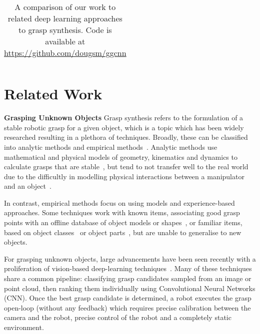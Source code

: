 \documentclass[conference]{IEEEtran}
\begin{document}
\begin{table*}[t!]
\begin{center}
\begin{tabular}{@{}lcccccccccc@{}}
        \bottomrule
        \end{tabular}
    
        \vspace{2mm}
        \caption{ A comparison of our work to related deep learning approaches to grasp synthesis.  \newline * Code is available at \href{https://github.com/dougsm/ggcnn}{https://github.com/dougsm/ggcnn}}
        \label{tab:comparison}
        \vspace{-8mm}
    \end{center}
    
\end{table*}


\section{Related Work}

\textbf{Grasping Unknown Objects}
Grasp synthesis refers to the formulation of a stable robotic grasp for a given object, which is a topic which has been widely researched resulting in a plethora of techniques.  Broadly, these can be classified into analytic methods and empirical methods~\cite{bohg2014data,sahbani2012overview}.  Analytic methods use mathematical and physical models of geometry, kinematics and dynamics to calculate grasps that are stable~\cite{bicchi2000robotic,Prattichizzo2008Grasping}, but tend to not transfer well to the real world due to the difficultly in modelling physical interactions between a manipulator and an object~\cite{bicchi2000robotic, Rubert2017OnSuccess, sahbani2012overview}.

In contrast, empirical methods focus on using models and experience-based approaches.  Some techniques work with known items, associating good grasp points with an offline database of object models or shapes~\cite{detry2009learning, goldfeder2007grasp, miller2003automatic}, or familiar items, based on object classes~\cite{Saxena2008RoboticVision} or object parts~\cite{el2008handling}, but are unable to generalise to new objects.  

For grasping unknown objects, large advancements have been seen recently with a proliferation of vision-based deep-learning techniques~\cite{Lenz2015DeepGrasps, Mahler2017Dex2, Pinto2016SupersizingHours,Redmon2015Real-timeNetworks, Wang2016RobotNetworks}. Many of these techniques share a common pipeline: classifying grasp candidates sampled from an image or point cloud, then ranking them individually using Convolutional Neural Networks (CNN).  Once the best grasp candidate is determined, a robot executes the grasp open-loop (without any feedback) which requires precise calibration between the camera and the robot, precise control of the robot and a completely static environment.
\end{document}
